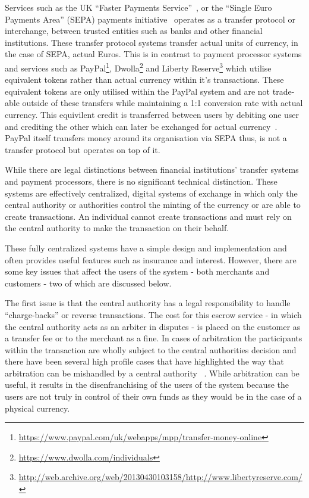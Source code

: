 Services  such as the UK ``Faster Payments  Service''~\cite{guardian-fps}, or the  ``Single Euro Payments Area''  (SEPA) payments initiative~\cite{SEPA}  operates as a transfer protocol or interchange, between trusted  entities such as banks and other financial institutions.  These transfer  protocol systems transfer  actual units of currency, in the case of SEPA, actual Euros.  This is  in contrast to payment processor systems and services such as PayPal\footnote{\url{https://www.paypal.com/uk/webapps/mpp/transfer-money-online}}, Dwolla\footnote{\url{https://www.dwolla.com/individuals}} and Liberty Reserve\footnote{\url{http://web.archive.org/web/20130430103158/http://www.libertyreserve.com/}} which utilise equivalent tokens rather than actual currency within it's transactions.  These equivalent tokens are only utilised within the PayPal system and are not trade-able outside of these transfers while maintaining a 1:1 conversion rate with actual currency. This equivilent credit is transferred between users by debiting one user and crediting the other which can later be exchanged for actual currency~\cite{paypal}.  PayPal itself transfers money around its organisation via SEPA thus, is not a transfer protocol but operates on top of it.

While there are legal distinctions between financial institutions' transfer systems and payment processors,  there is no significant technical distinction.  These systems are  effectively centralized, digital systems of exchange in which only the  central authority or authorities control the minting of the currency or  are able to create transactions.  An individual cannot create  transactions and must rely on the central authority to make the  transaction on their behalf.

These  fully centralized systems have a simple design and implementation and often provides useful features such as insurance and interest.  However,  there are some key issues that affect the users of the system -  both  merchants and customers - two of which are discussed  below.

The  first issue is that the central authority has a legal responsibility to  handle ``charge-backs'' or reverse transactions.   The  cost for this escrow service - in which the central authority acts as  an arbiter in  disputes - is placed on the customer as a transfer fee or  to the  merchant as a fine.  In cases of arbitration the participants within the transaction are wholly  subject to the central authorities decision and there have been several  high profile cases that have highlighted the way that arbitration can  be mishandled by a central authority ~\cite{violin}.   While arbitration can be useful, it results in the disenfranchising of  the users of the system because the users are not truly in control of  their own funds as they would be in the case of a physical currency.

